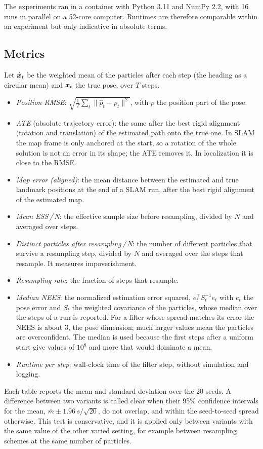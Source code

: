 The experiments ran in a container with Python 3.11 and NumPy 2.2, with 16 runs in parallel on a 52-core computer.
Runtimes are therefore comparable within an experiment but only indicative in absolute terms.

\subsection{Metrics}

Let $\hat{\bm{x}}_t$ be the weighted mean of the particles after each step (the heading as a circular mean) and $\bm{x}_t$ the
true pose, over $T$ steps.
\begin{itemize}
  \item \emph{Position RMSE}: $\sqrt{\frac{1}{T} \sum_t \lVert \hat{p}_t - p_t \rVert^2}$, with $p$ the position part of
        the pose.
  \item \emph{ATE} (absolute trajectory error): the same after the best rigid alignment (rotation and translation)
        of the estimated path onto the true one. In SLAM the map frame is only anchored at the start, so a rotation
        of the whole solution is not an error in its shape; the ATE removes it. In localization it is close to the
        RMSE.
  \item \emph{Map error (aligned)}: the mean distance between the estimated and true landmark positions at the end of
        a SLAM run, after the best rigid alignment of the estimated map.
  \item \emph{Mean ESS\,/\,N}: the effective sample size before resampling, divided by $N$ and averaged over steps.
  \item \emph{Distinct particles after resampling\,/\,N}: the number of different particles that survive a
        resampling step, divided by $N$ and averaged over the steps that resample. It measures impoverishment.
  \item \emph{Resampling rate}: the fraction of steps that resample.
  \item \emph{Median NEES}: the normalized estimation error squared, $e_t^\top S_t^{-1} e_t$ with $e_t$ the pose error
        and $S_t$ the weighted covariance of the particles, whose median over the steps of a run is reported. For a
        filter whose spread matches its error the NEES is about 3, the pose dimension; much larger values mean the
        particles are overconfident. The median is used because the first steps after a uniform start give values
        of $10^8$ and more that would dominate a mean.
  \item \emph{Runtime per step}: wall-clock time of the filter step, without simulation and logging.
\end{itemize}

Each table reports the mean and standard deviation over the 20 seeds. A difference between two variants is called
clear when their 95\% confidence intervals for the mean, $\bar{m} \pm 1.96\, s / \sqrt{20}$, do not overlap, and within
the seed-to-seed spread otherwise. This test is conservative, and it is applied only between variants with the same
value of the other varied setting, for example between resampling schemes at the same number of particles.
